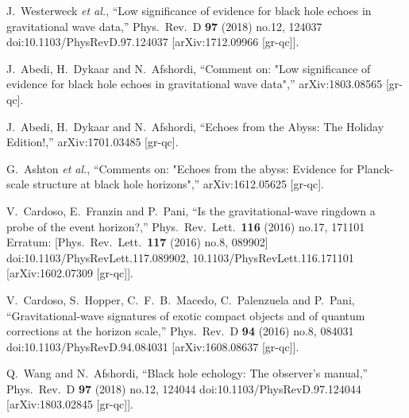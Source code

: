\documentclass[12pt]{article}
\begin{document}
\begin{thebibliography}{99}
  J.~Westerweck {\it et al.},
  ``Low significance of evidence for black hole echoes in gravitational wave data,''
  Phys.\ Rev.\ D {\bf 97} (2018) no.12,  124037
  doi:10.1103/PhysRevD.97.124037
  [arXiv:1712.09966 [gr-qc]].

  J.~Abedi, H.~Dykaar and N.~Afshordi,
  ``Comment on: "Low significance of evidence for black hole echoes in gravitational wave data",''
  arXiv:1803.08565 [gr-qc].
  
  J.~Abedi, H.~Dykaar and N.~Afshordi,
  ``Echoes from the Abyss: The Holiday Edition!,''
  arXiv:1701.03485 [gr-qc].
  
  G.~Ashton {\it et al.},
  ``Comments on: "Echoes from the abyss: Evidence for Planck-scale structure at black hole horizons",''
  arXiv:1612.05625 [gr-qc].
  
  V.~Cardoso, E.~Franzin and P.~Pani,
  ``Is the gravitational-wave ringdown a probe of the event horizon?,''
  Phys.\ Rev.\ Lett.\  {\bf 116} (2016) no.17,  171101
   Erratum: [Phys.\ Rev.\ Lett.\  {\bf 117} (2016) no.8,  089902]
  doi:10.1103/PhysRevLett.117.089902, 10.1103/PhysRevLett.116.171101
  [arXiv:1602.07309 [gr-qc]].

  V.~Cardoso, S.~Hopper, C.~F.~B.~Macedo, C.~Palenzuela and P.~Pani,
  ``Gravitational-wave signatures of exotic compact objects and of quantum corrections at the horizon scale,''
  Phys.\ Rev.\ D {\bf 94} (2016) no.8,  084031
  doi:10.1103/PhysRevD.94.084031
  [arXiv:1608.08637 [gr-qc]].
  
  Q.~Wang and N.~Afshordi,
  ``Black hole echology: The observer’s manual,''
  Phys.\ Rev.\ D {\bf 97} (2018) no.12,  124044
  doi:10.1103/PhysRevD.97.124044
  [arXiv:1803.02845 [gr-qc]].
 

\end{thebibliography}
\end{document}
